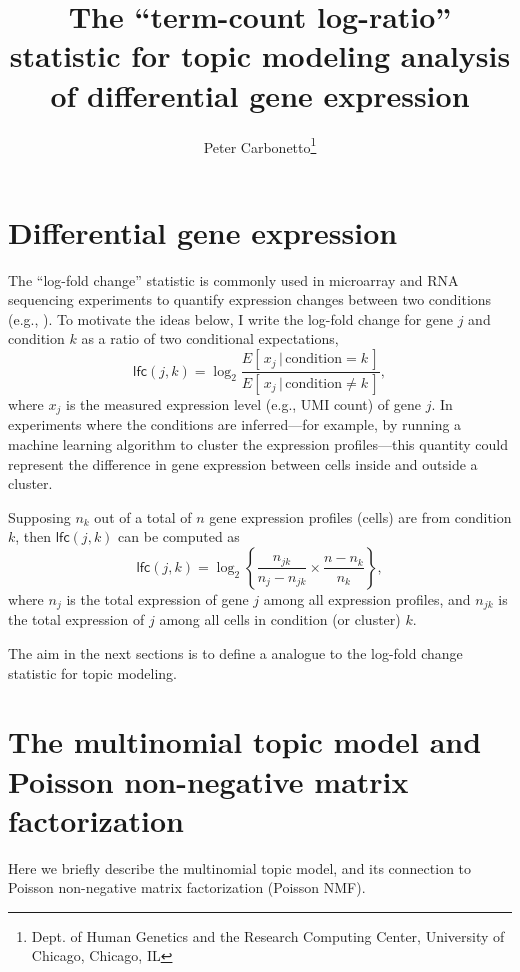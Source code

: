 \documentclass[final]{siamart171218}
\title{The ``term-count log-ratio'' statistic for topic modeling analysis
  of differential gene expression}
\author{Peter Carbonetto\thanks{Dept. of Human Genetics and the Research Computing Center, University of Chicago, Chicago, IL}}
\begin{document}
\maketitle

\section{Differential gene expression}

The ``log-fold change'' statistic is commonly used in microarray and
RNA sequencing experiments to quantify expression changes between two
conditions (e.g., \cite{cui-churchill-2003, quackenbush-2002}). To
motivate the ideas below, I write the log-fold change for gene $j$
and condition $k$ as a ratio of two conditional expectations,
\begin{equation}
\mathsf{lfc}(j,k) = \log_2 \frac{E[\,x_j \,|\, \mathrm{condition} = k\,]}
                                {E[\,x_j \,|\, \mathrm{condition} \neq k\,]},
\end{equation}
where $x_j$ is the measured expression level (e.g., UMI count) of gene
$j$. In experiments where the conditions are inferred---for example,
by running a machine learning algorithm to cluster the expression
profiles---this quantity could represent the difference in gene
expression between cells inside and outside a cluster.

Supposing $n_k$ out of a total of $n$ gene expression profiles
(cells) are from condition $k$, then $\mathsf{lfc}(j,k)$ can be
computed as
\begin{equation}
\mathsf{lfc}(j,k) =
\log_2 \left\{\frac{n_{jk}}{n_j - n_{jk}} \times \frac{n - n_k}{n_k} \right\},
\end{equation}
where $n_j$ is the total expression of gene $j$ among all expression
profiles, and $n_{jk}$ is the total expression of $j$ among all cells
in condition (or cluster) $k$.

The aim in the next sections is to define a analogue to the log-fold
change statistic for topic modeling.

\section{The multinomial topic model and Poisson non-negative matrix
  factorization}

Here we briefly describe the multinomial topic model, and its
connection to Poisson non-negative matrix factorization (Poisson NMF).
\end{document}
